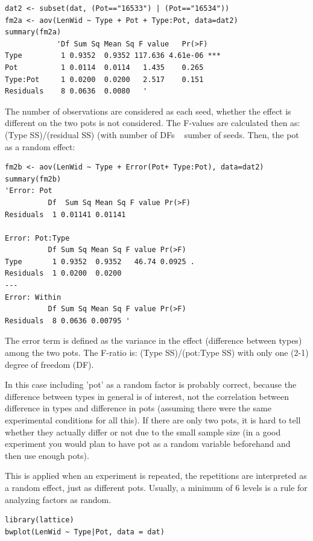 \documentclass{article}
\begin{document}
\begin{lstlisting}
dat2 <- subset(dat, (Pot=="16533") | (Pot=="16534"))
fm2a <- aov(LenWid ~ Type + Pot + Type:Pot, data=dat2)
summary(fm2a)
            'Df Sum Sq Mean Sq F value   Pr(>F)    
Type         1 0.9352  0.9352 117.636 4.61e-06 ***
Pot          1 0.0114  0.0114   1.435    0.265    
Type:Pot     1 0.0200  0.0200   2.517    0.151    
Residuals    8 0.0636  0.0080   '
\end{lstlisting}

The number of observations are considered as each seed, whether the effect is different on the two pots is not considered. The F-values are calculated then as: (Type SS)/(residual SS) (with number of DFs ~ sumber of seeds.
Then, the pot as a random effect:

\begin{lstlisting}
fm2b <- aov(LenWid ~ Type + Error(Pot+ Type:Pot), data=dat2)
summary(fm2b)
'Error: Pot
          Df  Sum Sq Mean Sq F value Pr(>F)
Residuals  1 0.01141 0.01141               

Error: Pot:Type
          Df Sum Sq Mean Sq F value Pr(>F)  
Type       1 0.9352  0.9352   46.74 0.0925 .
Residuals  1 0.0200  0.0200                 
---
Error: Within
          Df Sum Sq Mean Sq F value Pr(>F)
Residuals  8 0.0636 0.00795 '
\end{lstlisting}

The error term is defined as the variance in the effect (difference between types) among the two pots. The F-ratio is: (Type SS)/(pot:Type SS) with only one (2-1) degree of freedom (DF).\par 
In this case including 'pot' as a random factor is probably correct, because the difference between types in general is of interest, not the correlation between difference in types and difference in pots (assuming there were the same experimental conditions for all this). If there are only two pots, it is hard to tell whether they actually differ or not due to the small sample size (in a good experiment you would plan to have pot as a random variable beforehand and then use enough pots).\par 
This is applied when an experiment is repeated, the repetitions are interpreted as a random effect, just as different pots. Usually, a minimum of 6 levels is a rule for analyzing factors as random.

\begin{lstlisting}
library(lattice)
bwplot(LenWid ~ Type|Pot, data = dat)
\end{lstlisting}
\end{document}
